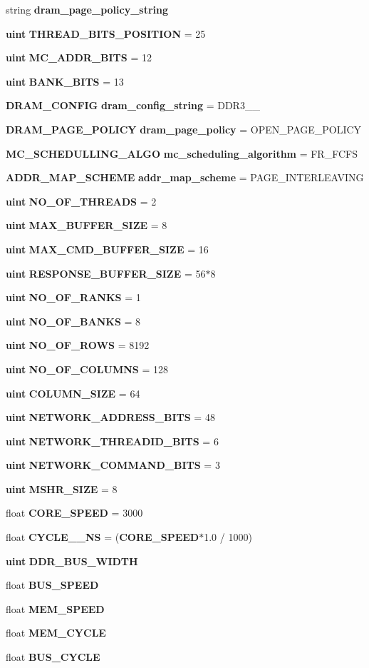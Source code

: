 \begin{CompactItemize}
\item 
string {\bf dram\_\-page\_\-policy\_\-string}
\item 
{\bf uint} {\bf THREAD\_\-BITS\_\-POSITION} = 25
\item 
{\bf uint} {\bf MC\_\-ADDR\_\-BITS} = 12
\item 
{\bf uint} {\bf BANK\_\-BITS} = 13
\item 
{\bf DRAM\_\-CONFIG} {\bf dram\_\-config\_\-string} = DDR3\_\_
\item 
{\bf DRAM\_\-PAGE\_\-POLICY} {\bf dram\_\-page\_\-policy} = OPEN\_\-PAGE\_\-POLICY
\item 
{\bf MC\_\-SCHEDULLING\_\-ALGO} {\bf mc\_\-scheduling\_\-algorithm} = FR\_\-FCFS
\item 
{\bf ADDR\_\-MAP\_\-SCHEME} {\bf addr\_\-map\_\-scheme} = PAGE\_\-INTERLEAVING
\item 
{\bf uint} {\bf NO\_\-OF\_\-THREADS} = 2
\item 
{\bf uint} {\bf MAX\_\-BUFFER\_\-SIZE} = 8
\item 
{\bf uint} {\bf MAX\_\-CMD\_\-BUFFER\_\-SIZE} = 16
\item 
{\bf uint} {\bf RESPONSE\_\-BUFFER\_\-SIZE} = 56$\ast$8
\item 
{\bf uint} {\bf NO\_\-OF\_\-RANKS} = 1
\item 
{\bf uint} {\bf NO\_\-OF\_\-BANKS} = 8
\item 
{\bf uint} {\bf NO\_\-OF\_\-ROWS} = 8192
\item 
{\bf uint} {\bf NO\_\-OF\_\-COLUMNS} = 128
\item 
{\bf uint} {\bf COLUMN\_\-SIZE} = 64
\item 
{\bf uint} {\bf NETWORK\_\-ADDRESS\_\-BITS} = 48
\item 
{\bf uint} {\bf NETWORK\_\-THREADID\_\-BITS} = 6
\item 
{\bf uint} {\bf NETWORK\_\-COMMAND\_\-BITS} = 3
\item 
{\bf uint} {\bf MSHR\_\-SIZE} = 8
\item 
float {\bf CORE\_\-SPEED} = 3000
\item 
float {\bf CYCLE\_\_\-NS} = ({\bf CORE\_\-SPEED}$\ast$1.0 / 1000)
\item 
{\bf uint} {\bf DDR\_\-BUS\_\-WIDTH}
\item 
float {\bf BUS\_\-SPEED}
\item 
float {\bf MEM\_\-SPEED}
\item 
float {\bf MEM\_\-CYCLE}
\item 
float {\bf BUS\_\-CYCLE}

\end{CompactItemize}
